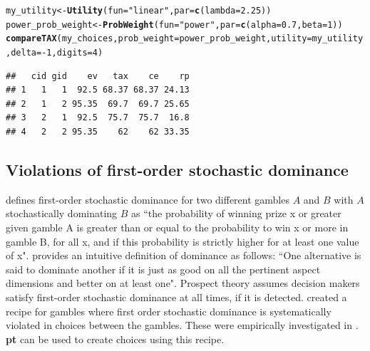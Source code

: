 \documentclass{article}\usepackage[]{graphicx}\usepackage[]{color}
\makeatletter
\newcommand{\hlnum}[1]{\textcolor[rgb]{0.686,0.059,0.569}{#1}}%
\newcommand{\hlstr}[1]{\textcolor[rgb]{0.192,0.494,0.8}{#1}}%
\newcommand{\hlopt}[1]{\textcolor[rgb]{0,0,0}{#1}}%
\newcommand{\hlstd}[1]{\textcolor[rgb]{0.345,0.345,0.345}{#1}}%
\newcommand{\hlkwb}[1]{\textcolor[rgb]{0.69,0.353,0.396}{#1}}%
\newcommand{\hlkwc}[1]{\textcolor[rgb]{0.333,0.667,0.333}{#1}}%
\newcommand{\hlkwd}[1]{\textcolor[rgb]{0.737,0.353,0.396}{\textbf{#1}}}%
\newenvironment{kframe}{%
 \def\at@end@of@kframe{}%
 \ifinner\ifhmode%
  \def\at@end@of@kframe{\end{minipage}}%
  \begin{minipage}{\columnwidth}%
 \fi\fi%
 \def\FrameCommand##1{\hskip\@totalleftmargin \hskip-\fboxsep
 \colorbox{shadecolor}{##1}\hskip-\fboxsep
     \hskip-\linewidth \hskip-\@totalleftmargin \hskip\columnwidth}%
 \MakeFramed {\advance\hsize-\width
   \@totalleftmargin\z@ \linewidth\hsize
   \@setminipage}}%
 {\par\unskip\endMakeFramed%
 \at@end@of@kframe}
\newenvironment{knitrout}{}{} %
\makeatother
\begin{document}
\begin{knitrout}
\color{fgcolor}\begin{kframe}
\begin{alltt}
\hlstd{my_utility} \hlkwb{<-} \hlkwd{Utility}\hlstd{(}\hlkwc{fun}\hlstd{=}\hlstr{"linear"}\hlstd{,} \hlkwc{par}\hlstd{=}\hlkwd{c}\hlstd{(}\hlkwc{lambda}\hlstd{=}\hlnum{2.25}\hlstd{))}
\hlstd{power_prob_weight} \hlkwb{<-} \hlkwd{ProbWeight}\hlstd{(}\hlkwc{fun}\hlstd{=}\hlstr{"power"}\hlstd{,} \hlkwc{par}\hlstd{=}\hlkwd{c}\hlstd{(}\hlkwc{alpha}\hlstd{=}\hlnum{0.7}\hlstd{,} \hlkwc{beta}\hlstd{=}\hlnum{1}\hlstd{))}
\hlkwd{compareTAX}\hlstd{(my_choices,} \hlkwc{prob_weight}\hlstd{=power_prob_weight,} \hlkwc{utility}\hlstd{=my_utility,} \hlkwc{delta}\hlstd{=}\hlopt{-}\hlnum{1}\hlstd{,} \hlkwc{digits}\hlstd{=}\hlnum{4}\hlstd{)}
\end{alltt}
\begin{verbatim}
##   cid gid    ev   tax    ce    rp
## 1   1   1  92.5 68.37 68.37 24.13
## 2   1   2 95.35  69.7  69.7 25.65
## 3   2   1  92.5  75.7  75.7  16.8
## 4   2   2 95.35    62    62 33.35
\end{verbatim}
\end{kframe}
\end{knitrout}



\subsection{Violations of first-order stochastic dominance}

\citet[p. 263-264]{Birnbaum_2005b} defines first-order stochastic dominance for two different gambles $A$ and $B$
with $A$ stochastically dominating $B$ as ``the probability of winning prize x or greater given gamble A is greater than or
equal to the probability to win x or more in gamble B, for all x, and if this probability is
strictly higher for at least one value of x".
\citet[][p. 221]{Yates_1990} provides an intuitive definition of dominance as follows: ``One alternative is said to dominate another if it is just as good on all
the pertinent aspect dimensions and better on at least one".
Prospect theory assumes decision makers satisfy first-order stochastic dominance at all times, if it is
detected.
\citet[][p. 74]{Birnbaum_1997} created a recipe for gambles where first order stochastic dominance is systematically
violated in choices between the gambles. These were empirically investigated in \citet[][]{Birnbaum_Navarrete_1998}. 
{\bf pt} can be used to create choices using this recipe.
\end{document}
